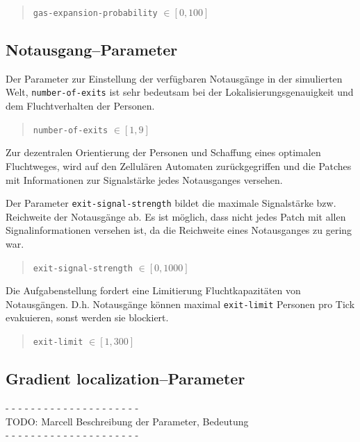 \begin{quote}
\verb|gas-expansion-probability| $\in [0, 100]$
\end{quote}


\subsection{Notausgang--Parameter}
\label{sec:gui_exit}

Der Parameter zur Einstellung der verfügbaren Notausgänge in der simulierten Welt, 
\verb|number-of-exits| ist sehr bedeutsam bei der Lokalisierungsgenauigkeit und dem Fluchtverhalten der Personen.

\begin{quote}
\verb|number-of-exits| $\in [1, 9]$
\end{quote}

Zur dezentralen Orientierung der Personen und Schaffung eines optimalen Fluchtweges, wird auf den Zellulären Automaten zurückgegriffen und die Patches mit Informationen zur Signalstärke jedes Notausganges versehen.\par
Der Parameter \verb|exit-signal-strength| bildet die maximale Signalstärke bzw. Reichweite der Notausgänge ab. Es ist möglich, dass nicht jedes Patch mit allen Signalinformationen versehen ist, da die Reichweite eines Notausganges zu gering war.

\begin{quote}
\verb|exit-signal-strength| $\in [0, 1000]$
\end{quote}

Die Aufgabenstellung fordert eine Limitierung Fluchtkapazitäten von Notausgängen. D.h. Notausgänge können maximal \verb|exit-limit| Personen pro Tick evakuieren, sonst werden sie blockiert.

\begin{quote}
\verb|exit-limit| $\in [1, 300]$
\end{quote}

\subsection{Gradient localization--Parameter}
\label{sec:gui_localization}

- - - - - - - - - - - - - - - - - - - - - \\
TODO: Marcell Beschreibung der Parameter, Bedeutung\\
- - - - - - - - - - - - - - - - - - - - - \\

